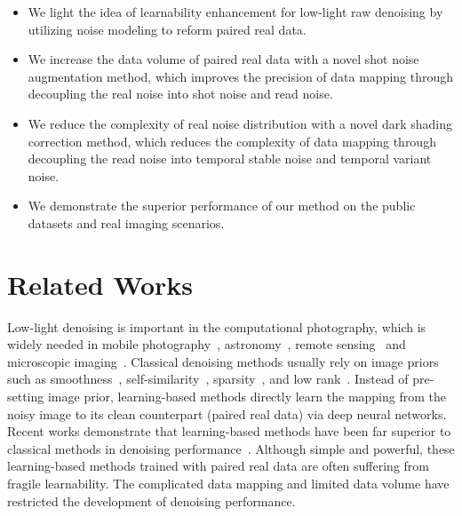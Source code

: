 \documentclass[sigconf,screen,nonacm]{acmart}
\begin{document}
\begin{itemize}[leftmargin=*]
    \item We light the idea of learnability enhancement for low-light raw denoising by utilizing noise modeling to reform paired real data.
    \item We increase the data volume of paired real data with a novel shot noise augmentation method, which improves the precision of data mapping through decoupling the real noise into shot noise and read noise.
\item We reduce the complexity of real noise distribution with a novel dark shading correction method, which reduces the complexity of data mapping through decoupling the read noise into temporal stable noise and temporal variant noise.
\item We demonstrate the superior performance of our method on the public datasets and real imaging scenarios.
\end{itemize}
   























\section{Related Works}\label{sec:RelatedWorks}
Low-light denoising is important in the computational photography, which is widely needed in mobile photography~\cite{TOG16/HDR+,TOG19/HDR+3,ECCV20/Yuzhi}, astronomy~\cite{astronomy}, remote sensing~\cite{remote} and microscopic imaging~\cite{microscopic}.
Classical denoising methods usually rely on image priors such as smoothness~\cite{wavelet,TV}, self-similarity~\cite{NLM,BM3D,VBM4D}, sparsity~\cite{elad2006image, K-SVD}, and low rank~\cite{WNNM}.
Instead of pre-setting image prior, learning-based methods directly learn the mapping from the noisy image to its clean counterpart (paired real data) via deep neural networks.
Recent works demonstrate that learning-based methods have been far superior to classical methods in denoising performance~\cite{CVPR18/SID, ICCV19/DRV, RViDeNet}.
Although simple and powerful, these learning-based methods trained with paired real data are often suffering from fragile learnability.
The complicated data mapping and limited data volume have restricted the development of denoising performance.
\end{document}
